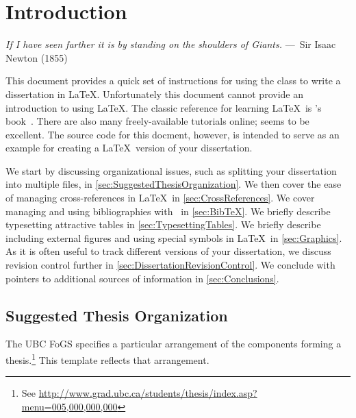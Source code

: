 
\chapter{Introduction}
\label{ch:Introduction}

\begin{epigraph}
    \emph{If I have seen farther it is by standing on the shoulders of
    Giants.} ---~Sir Isaac Newton (1855)
\end{epigraph}

This document provides a quick set of instructions for using the
 class to write a dissertation in \LaTeX. 
Unfortunately this document cannot provide an introduction to using
\LaTeX.  The classic reference for learning \LaTeX\ is
\citeauthor{lamport-1994-ladps}'s
book~\cite{lamport-1994-ladps}.  There are also many freely-available
tutorials online;
seems to be excellent.
The source code for this docment, however, is intended to serve as
an example for creating a \LaTeX\ version of your dissertation.

We start by discussing organizational issues, such as splitting
your dissertation into multiple files, in
\autoref{sec:SuggestedThesisOrganization}.
We then cover the ease of managing cross-references in \LaTeX\ in
\autoref{sec:CrossReferences}.
We cover managing and using bibliographies with \BibTeX\ in
\autoref{sec:BibTeX}. 
We briefly describe typesetting attractive tables in
\autoref{sec:TypesettingTables}.
We briefly describe including external figures and using
special symbols in \LaTeX\ in \autoref{sec:Graphics}.
As it is often useful to track different versions of your dissertation,
we discuss revision control further in
\autoref{sec:DissertationRevisionControl}. 
We conclude with pointers to additional sources of information in
\autoref{sec:Conclusions}.

\section{Suggested Thesis Organization}
\label{sec:SuggestedThesisOrganization}

The \acs{UBC} \acf{FoGS} specifies a particular arrangement of the
components forming a thesis.\footnote{See
    \url{http://www.grad.ubc.ca/students/thesis/index.asp?menu=005,000,000,000}}
This template reflects that arrangement.

